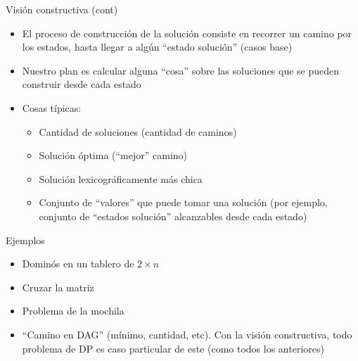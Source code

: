 \documentclass{beamer}
\begin{document}
\begin{frame}{Visión constructiva (cont)}
	\begin{itemize}
		\item El proceso de construcción de la solución consiste en recorrer un camino por los estados, hasta llegar a algún ``estado solución'' (casos base)
		\item Nuestro plan es calcular alguna ``cosa'' sobre las soluciones que se pueden construir desde cada estado
		\item Cosas típicas:
			\begin{itemize}
				 \item Cantidad de soluciones (cantidad de caminos)
				 \item Solución óptima (``mejor'' camino)
				 \item Solución lexicográficamente más chica
				 \item Conjunto de ``valores'' que puede tomar una solución (por ejemplo, conjunto de ``estados solución'' alcanzables desde cada estado)
			\end{itemize}
	\end{itemize}
\end{frame}


\begin{frame}{Ejemplos}
	\begin{itemize}
		\item Dominós en un tablero de $2 \times n$
		\item Cruzar la matriz
		\item Problema de la mochila
		\item ``Camino en DAG'' (mínimo, cantidad, etc). Con la visión constructiva, todo problema de DP es caso particular de este (como todos los anteriores)
	\end{itemize}
\end{frame}
\end{document}
